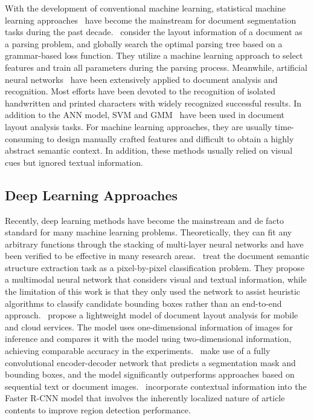 \documentclass[sigconf]{acmart}
\begin{document}
With the development of conventional machine learning, statistical machine learning approaches~\citep{shilman2005learning,1359749} have become the mainstream for document segmentation tasks during the past decade.~\cite{shilman2005learning} consider the layout information of a document as a parsing problem, and globally search the optimal parsing tree based on a grammar-based loss function. They utilize a machine learning approach to select features and train all parameters during the parsing process. Meanwhile, artificial neural networks~\citep{1359749} have been extensively applied to document analysis and recognition. Most efforts have been devoted to the recognition of isolated handwritten and printed characters with widely recognized successful results. In addition to the ANN model, SVM and GMM~\citep{6628808} have been used in document layout analysis tasks. For machine learning approaches, they are usually time-consuming to design manually crafted features and difficult to obtain a highly abstract semantic context. In addition, these methods usually relied on visual cues but ignored textual information.

\subsection{Deep Learning Approaches}

Recently, deep learning methods have become the mainstream and de facto standard for many machine learning problems. Theoretically, they can fit any arbitrary functions through the stacking of multi-layer neural networks and have been verified to be effective in many research areas.~\cite{Yang2017LearningTE} treat the document semantic structure extraction task as a pixel-by-pixel classification problem. They propose a multimodal neural network that considers visual and textual information, while the limitation of this work is that they only used the network to assist heuristic algorithms to classify candidate bounding boxes rather than an end-to-end approach.~\cite{Viana2017FastCD} propose a lightweight model of document layout analysis for mobile and cloud services. The model uses one-dimensional information of images for inference and compares it with the model using two-dimensional information, achieving comparable accuracy in the experiments.~\cite{katti-etal-2018-chargrid} make use of a fully convolutional encoder-decoder network that predicts a segmentation mask and bounding boxes, and the model significantly outperforms approaches based on sequential text or document images.~\cite{soto-yoo-2019-visual} incorporate contextual information into the Faster R-CNN model that involves the inherently localized nature of article contents to improve region detection performance.
\end{document}
